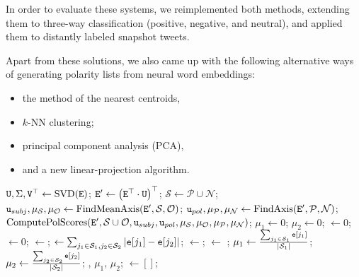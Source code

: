 In order to evaluate these systems, we reimplemented both methods,
extending them to three-way classification (positive, negative, and
neutral), and applied them to distantly labeled snapshot tweets.

Apart from these solutions, we also came up with the following
alternative ways of generating polarity lists from neural word
embeddings:
\begin{itemize}
\item the method of the nearest centroids,
\item $k$-NN clustering;
\item principal component analysis (PCA),
\item and a new linear-projection algorithm.
\end{itemize}

\begin{algorithm}
  \begin{algorithmic}[1]
    \Statex{}
    \Statex{}
    \State $\texttt{U}, \Sigma, \texttt{V}^\top\gets\textrm{SVD}(\texttt{E})$;
    \State $\texttt{E}'\gets\left(\texttt{E}^\top\cdot \texttt{U}\right)^\top$;
    \State $\mathcal{S}\gets\mathcal{P}\cup\mathcal{N}$;
    \State $\texttt{u}_{subj}, \mu_{\mathcal{S}}, \mu_{\mathcal{O}}\gets\textrm{FindMeanAxis}(\texttt{E}', \mathcal{S}, \mathcal{O})$;
    \State $\texttt{u}_{pol}, \mu_{\mathcal{P}}, \mu_{\mathcal{N}}\gets\textrm{FindAxis}(\texttt{E}', \mathcal{P}, \mathcal{N})$;
    \State\Return $\func{ComputePolScores}(\vars{E}', \mathcal{S}\cup\mathcal{O},%
    \vars{u}_{subj}, \vars{u}_{pol}, \mu_{\mathcal{S}}, \mu_{\mathcal{O}},%
    \mu_{\mathcal{P}}, \mu_{\mathcal{N}})$;
    \EndFunction
    \Statex
    \State $\mu_1\gets 0$; $\mu_2\gets 0$;  $\gets 0$;  $\gets 0$;
    \State {} $\gets$;
    \State {} $\gets\sum_{j_1\in\mathcal{S}_1,j_2\in\mathcal{S}_2}\left|\texttt{e}[j_1] - \texttt{e}[j_2]\right|$;
    \State {} $\gets$;  $\gets$ ;
    \State $\mu_1\gets\frac{\sum_{j_1\in\mathcal{S}_1}\texttt{e}[j_1]}{|\mathcal{S}_1|}$; $\mu_2\gets\frac{\sum_{j_2\in\mathcal{S}_2}\texttt{e}[j_2]}{|\mathcal{S}_2|}$;
    \EndIf
    \EndFor
    \State\Return{}, $\mu_1$, $\mu_2$;
    \EndFunction
    \Statex
    \State{} $\gets []$;


\end{algorithmic}
\end{algorithm}
